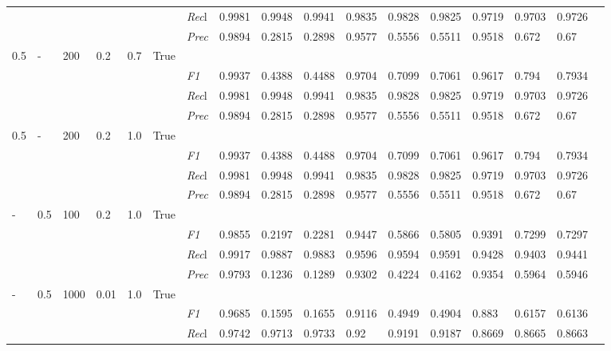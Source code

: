\begin{table}[]
\begin{tabularx}{\textwidth}{XXXXXX|X|XXX|XXX|XXXX}
    & & & & & & \textit{Rec}l & 0.9981 & 0.9948 & 0.9941    & 0.9835 & 0.9828    & 0.9825    & 0.9719    & 0.9703    & 0.9726    \\
    & & & & & & \textit{Prec} & 0.9894 & 0.2815 & 0.2898 & 0.9577 & 0.5556 & 0.5511 & 0.9518 & 0.672 & 0.67 \\ \midrule
    0.5 & - & 200 & 0.2 & 0.7 &True & & & & & & & & & \\
    & & & & & & \textit{F1} & 0.9937 & 0.4388 & 0.4488 & 0.9704 & 0.7099        & 0.7061        & 0.9617        & 0.794        & 0.7934        \\
    & & & & & & \textit{Rec}l & 0.9981 & 0.9948 & 0.9941    & 0.9835 & 0.9828    & 0.9825    & 0.9719    & 0.9703    & 0.9726    \\
    & & & & & & \textit{Prec} & 0.9894 & 0.2815 & 0.2898 & 0.9577 & 0.5556 & 0.5511 & 0.9518 & 0.672 & 0.67 \\ \midrule
    0.5 & - & 200 & 0.2 & 1.0 &True & & & & & & & & & \\
    & & & & & & \textit{F1} & 0.9937 & 0.4388 & 0.4488 & 0.9704 & 0.7099        & 0.7061        & 0.9617        & 0.794        & 0.7934        \\
    & & & & & & \textit{Rec}l & 0.9981 & 0.9948 & 0.9941    & 0.9835 & 0.9828    & 0.9825    & 0.9719    & 0.9703    & 0.9726    \\
    & & & & & & \textit{Prec} & 0.9894 & 0.2815 & 0.2898 & 0.9577 & 0.5556 & 0.5511 & 0.9518 & 0.672 & 0.67 \\ \midrule
    - & 0.5 & 100 & 0.2 & 1.0 &True & & & & & & & & & \\
    & & & & & & \textit{F1} & 0.9855 & 0.2197 & 0.2281 & 0.9447 & 0.5866        & 0.5805        & 0.9391        & 0.7299        & 0.7297        \\
    & & & & & & \textit{Rec}l & 0.9917 & 0.9887 & 0.9883    & 0.9596 & 0.9594    & 0.9591    & 0.9428    & 0.9403    & 0.9441    \\
    & & & & & & \textit{Prec} & 0.9793 & 0.1236 & 0.1289 & 0.9302 & 0.4224 & 0.4162 & 0.9354 & 0.5964 & 0.5946 \\ \midrule
    - & 0.5 & 1000 & 0.01 & 1.0 &True & & & & & & & & & \\
    & & & & & & \textit{F1} & 0.9685 & 0.1595 & 0.1655 & 0.9116 & 0.4949        & 0.4904        & 0.883        & 0.6157        & 0.6136        \\
    & & & & & & \textit{Rec}l & 0.9742 & 0.9713 & 0.9733    & 0.92 & 0.9191    & 0.9187    & 0.8669    & 0.8665    & 0.8663    \\

\end{tabularx}
\end{table}
